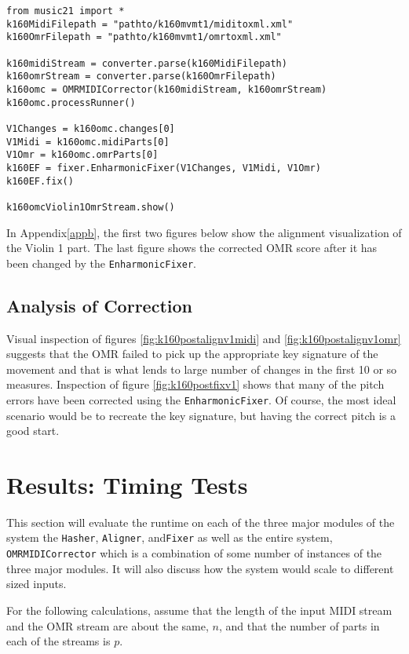 \begin{verbatim}
from music21 import *
k160MidiFilepath = "pathto/k160mvmt1/miditoxml.xml"
k160OmrFilepath = "pathto/k160mvmt1/omrtoxml.xml"
         
k160midiStream = converter.parse(k160MidiFilepath)
k160omrStream = converter.parse(k160OmrFilepath)
k160omc = OMRMIDICorrector(k160midiStream, k160omrStream)
k160omc.processRunner()
        
V1Changes = k160omc.changes[0]
V1Midi = k160omc.midiParts[0]
V1Omr = k160omc.omrParts[0]
k160EF = fixer.EnharmonicFixer(V1Changes, V1Midi, V1Omr)
k160EF.fix()

k160omcViolin1OmrStream.show()
\end{verbatim}

In Appendix\ref{appb}, the first two figures below show the alignment visualization of the Violin 1 part. The last figure shows the corrected OMR score after it has been changed by the \texttt{EnharmonicFixer}.

\subsection{Analysis of Correction}
Visual inspection of figures \ref{fig:k160postalignv1midi} and \ref{fig:k160postalignv1omr} suggests that the OMR failed to pick up the appropriate key signature of the movement and that is what lends to large number of changes in the first 10 or so measures. Inspection of figure \ref{fig:k160postfixv1} shows that many of the pitch errors have been corrected using the \texttt{EnharmonicFixer}. Of course, the most ideal scenario would be to recreate the key signature, but having the correct pitch is a good start. 

\section{Results: Timing Tests} \label{timing}
This section will evaluate the runtime on each of the three major modules of the system the \texttt{Hasher}, \texttt{Aligner}, and\texttt{Fixer} as well as the entire system, \texttt{OMRMIDICorrector} which is a combination of some number of instances of the three major modules. It will also discuss how the system would scale to different sized inputs. 

For the following calculations, assume that the length of the input MIDI stream and the OMR stream are about the same, $n$, and that the number of parts in each of the streams is $p$. 

